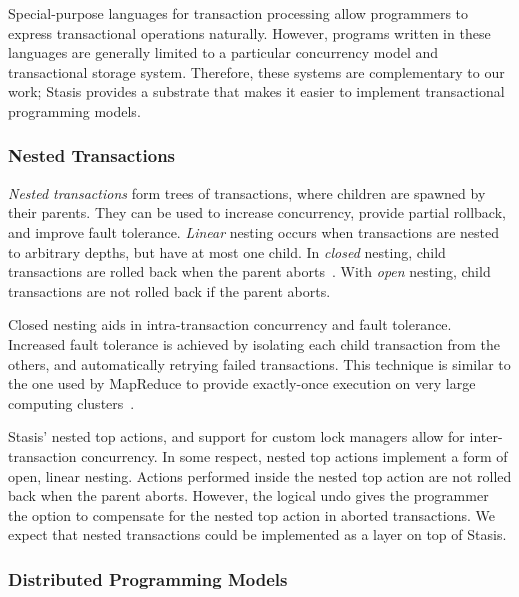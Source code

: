 \documentclass[letterpaper,twocolumn,10pt]{article}
\newcommand{\yad}{Stasis\xspace}
\newcommand{\yads}{Stasis'\xspace}
\begin{document}
Special-purpose languages for transaction processing allow programmers
to express transactional operations naturally.  However, programs
written in these languages are generally limited to a particular
concurrency model and transactional storage system.  Therefore, these
systems are complementary to our work; \yad provides a substrate that makes
it easier to implement transactional programming models.

\subsubsection{Nested Transactions}

{\em Nested transactions} form trees of transactions, where children
are spawned by their parents.  They can be used to increase
concurrency, provide partial rollback, and improve fault tolerance.
{\em Linear} nesting occurs when transactions are nested to arbitrary
depths, but have at most one child.  In {\em closed} nesting, child
transactions are rolled back when the parent
aborts~\cite{nestedTransactionBook}.  With {\em open} nesting, child
transactions are not rolled back if the parent aborts.  

Closed nesting aids in intra-transaction concurrency and fault
tolerance.  Increased fault tolerance is achieved by isolating each
child transaction from the others, and automatically retrying failed
transactions.  This technique is similar to the one used by MapReduce
to provide exactly-once execution on very large computing 
clusters~\cite{mapReduce}.


\yads nested top actions, and support for custom lock managers
allow for inter-transaction concurrency.  In some respect, nested top
actions implement a form of open, linear nesting.  Actions performed
inside the nested top action are not rolled back when the parent aborts.
However, the logical undo gives the programmer the option to
compensate for the nested top action in aborted transactions.  We expect
that nested transactions
could be implemented as a layer on top of \yad.

\subsubsection{Distributed Programming Models}
\end{document}
